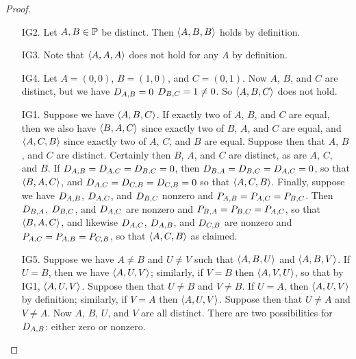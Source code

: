 \begin{proof}\mbox{}
\begin{itemize}
\item[IG2.] Let \(A,B \in \mathbb{P}\) be distinct.
Then \(\langle A, B, B \rangle\) holds by definition.

\item[IG3.] Note that \(\langle A, A, A \rangle\) does not hold for any \(A\) by definition.

\item[IG4.] Let \(A = (0,0)\), \(B = (1,0)\), and \(C = (0,1)\).
Now \(A\), \(B\), and \(C\) are distinct, but we have \(D_{A,B} = 0\) \(D_{B,C} = 1 \neq 0\).
So \(\langle A, B, C \rangle\) does not hold.

\item[IG1.] Suppose we have \(\langle A, B, C \rangle\).
If exactly two of \(A\), \(B\), and \(C\) are equal, then we also have \(\langle B, A, C \rangle\) since exactly two of \(B\), \(A\), and \(C\) are equal, and \(\langle A, C, B \rangle\) since exactly two of \(A\), \(C\), and \(B\) are equal.
Suppose then that \(A\), \(B\), and \(C\) are distinct.
Certainly then \(B\), \(A\), and \(C\) are distinct, as are \(A\), \(C\), and \(B\).
If \(D_{A,B} = D_{A,C} = D_{B,C} = 0\), then \(D_{B,A} = D_{B,C} = D_{A,C} = 0\), so that \(\langle B, A, C \rangle\), and \(D_{A,C} = D_{C,B} = D_{C,B} = 0\) so that \(\langle A, C, B \rangle\).
Finally, suppose we have \(D_{A,B}\), \(D_{A,C}\), and \(D_{B,C}\) nonzero and \(P_{A,B} = P_{A,C} = P_{B,C}\).
Then \(D_{B,A}\), \(D_{B,C}\), and \(D_{A,C}\) are nonzero and \(P_{B,A} = P_{B,C} = P_{A,C}\), so that \(\langle B, A, C \rangle\), and likewise \(D_{A,C}\), \(D_{A,B}\), and \(D_{C,B}\) are nonzero and \(P_{A,C} = P_{A,B} = P_{C,B}\), so that \(\langle A, C, B \rangle\) as claimed.

\item[IG5.] Suppose we have \(A \neq B\) and \(U \neq V\) such that \(\langle A, B, U \rangle\) and \(\langle A, B, V \rangle\).
If \(U = B\), then we have \(\langle A, U, V \rangle\); similarly, if \(V = B\) then \(\langle A, V, U \rangle\), so that by IG1, \(\langle A, U, V \rangle\).
Suppose then that \(U \neq B\) and \(V \neq B\).
If \(U = A\), then \(\langle A, U, V \rangle\) by definition; similarly, if \(V = A\) then \(\langle A, U, V \rangle\).
Suppose then that \(U \neq A\) and \(V \neq A\).
Now \(A\), \(B\), \(U\), and \(V\) are all distinct.
There are two possibilities for \(D_{A,B}\): either zero or nonzero.


\end{itemize}
\end{proof}
